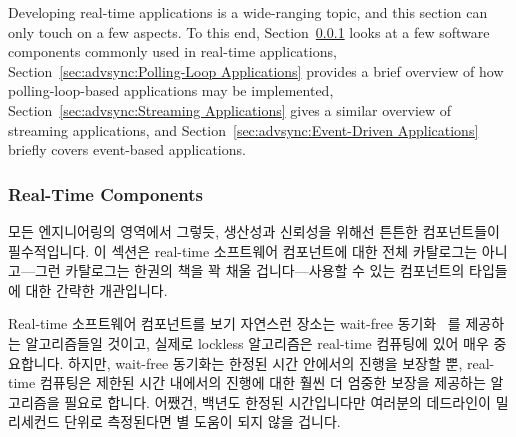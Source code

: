 Developing real-time applications is a wide-ranging topic, and this
section can only touch on a few aspects.
To this end,
Section~\ref{sec:advsync:Real-Time Components}
looks at a few software components commonly used in real-time applications,
Section~\ref{sec:advsync:Polling-Loop Applications}
provides a brief overview of how polling-loop-based applications may
be implemented,
Section~\ref{sec:advsync:Streaming Applications}
gives a similar overview of streaming applications, and
Section~\ref{sec:advsync:Event-Driven Applications}
briefly covers event-based applications.
\fi

\subsubsection{Real-Time Components}
\label{sec:advsync:Real-Time Components}

모든 엔지니어링의 영역에서 그렇듯, 생산성과 신뢰성을 위해선 튼튼한 컴포넌트들이
필수적입니다.
이 섹션은 real-time 소프트웨어 컴포넌트에 대한 전체 카탈로그는 아니고---그런
카탈로그는 한권의 책을 꽉 채울 겁니다---사용할 수 있는 컴포넌트의 타입들에
대한 간략한 개관입니다.

Real-time 소프트웨어 컴포넌트를 보기 자연스런 장소는 wait-free
동기화~\cite{Herlihy91} 를 제공하는 알고리즘들일 것이고, 실제로 lockless
알고리즘은 real-time 컴퓨팅에 있어 매우 중요합니다.
하지만, wait-free 동기화는 한정된 시간 안에서의 진행을 보장할 뿐, real-time
컴퓨팅은 제한된 시간 내에서의 진행에 대한 훨씬 더 엄중한 보장을 제공하는
알고리즘을 필요로 합니다.
어쨌건, 백년도 한정된 시간입니다만 여러분의 데드라인이 밀리세컨드 단위로
측정된다면 별 도움이 되지 않을 겁니다.

